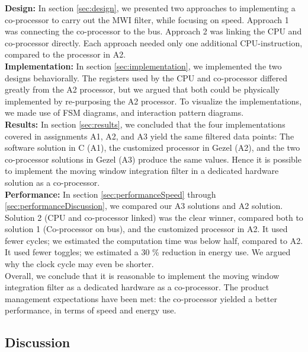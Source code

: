 
\textbf{Design:} In section \ref{sec:design}, we presented two approaches to implementing a co-processor to carry out the MWI filter, while focusing on speed. Approach 1 was connecting the co-processor to the bus. Approach 2 was linking the CPU and co-processor directly. Each approach needed only one additional CPU-instruction, compared to the processor in A2.\\

\textbf{Implementation:} In section \ref{sec:implementation}, we implemented the two designs behaviorally. The registers used by the CPU and co-processor differed greatly from the A2 processor, but we argued that both could be physically implemented by re-purposing the A2 processor. To visualize the implementations, we made use of FSM diagrams, and  interaction pattern diagrams. \\

\textbf{Results:} In section \ref{sec:results}, we concluded that the four implementations covered in assignments A1, A2, and A3 yield the same filtered data points: The software solution in C (A1), the customized processor in Gezel (A2), and the two co-processor solutions in Gezel (A3) produce the same values. Hence it is possible to implement the moving window integration filter in a dedicated hardware solution as a co-processor.\\

\textbf{Performance:} In section \ref{sec:performanceSpeed} through \ref{sec:performanceDiscussion}, we compared our A3 solutions and A2 solution. Solution 2 (CPU and co-processor linked) was the clear winner, compared both to solution 1 (Co-processor on bus), and the customized processor in A2. It used fewer cycles; we estimated the computation time was below half, compared to A2. It used fewer toggles; we estimated a 30 \% reduction in energy use. We argued why the clock cycle may even be shorter.\\

Overall, we conclude that it is reasonable to implement the moving window integration filter as a dedicated hardware as a co-processor. The product management expectations have been met: the co-processor yielded a better performance, in terms of speed and energy use.

\subsection{Discussion}

